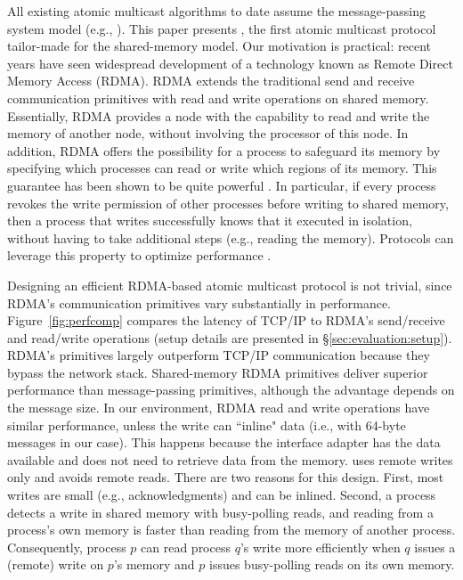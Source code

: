 All existing atomic multicast algorithms to date assume the message-passing system model (e.g., \cite{Coelho2017,gotsman2019white,birman1987reliable, delporte2000fault, bezerra2015ridge,
marandi2012multi}).
This paper presents \libname, the first atomic multicast protocol tailor-made for the shared-memory model.
Our motivation is practical: recent years have seen widespread development of a technology known as Remote Direct Memory Access (RDMA).
RDMA extends the traditional send and receive communication primitives with read and write operations on shared memory.
Essentially, RDMA provides a node with the capability to read and write the memory of another node, without involving the processor of this node.
In addition, RDMA offers the possibility for a process to safeguard its memory by specifying which processes can read or write which regions of its memory.
This guarantee has been shown to be quite powerful \cite{Aguilera2019}.
In particular, if every process revokes the write permission of other processes before writing to shared memory, then a process that writes successfully knows that it executed in isolation, without having to take additional steps (e.g., reading the memory). 
Protocols can leverage this property to optimize performance \cite{Aguilera2019}.

Designing an efficient RDMA-based atomic multicast protocol is not trivial, since RDMA's communication primitives vary substantially in performance.
Figure~\ref{fig:perfcomp} compares the latency of TCP/IP to RDMA's send/receive and read/write operations (setup details are presented in \S\ref{sec:evaluation:setup}).
RDMA's primitives largely outperform TCP/IP communication because they bypass the network stack.
Shared-memory RDMA primitives deliver superior performance than message-passing primitives, although the advantage depends on the message size.
In our environment, RDMA read and write operations have similar performance, unless the write can ``inline" data (i.e., with 64-byte messages in our case).
This happens because the interface adapter has the data available and does not need to retrieve data from the memory.
\libname uses remote writes only and avoids remote reads.
There are two reasons for this design.
First, most writes are small (e.g., acknowledgments) and can be inlined.
Second, a process detects a write in shared memory with busy-polling reads, and reading from a process's own memory is faster than reading from the memory of another process.
Consequently, process $p$ can read process $q$'s write more efficiently when $q$ issues a (remote) write on $p$'s memory and $p$ issues busy-polling reads on its own memory.  

